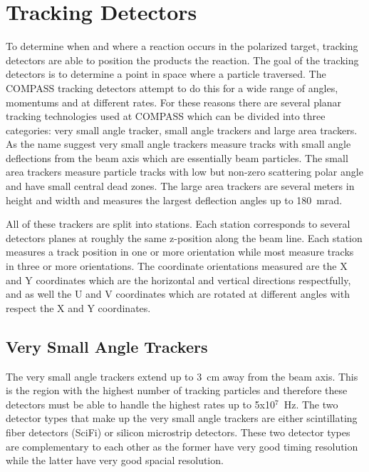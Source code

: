 \section{Tracking Detectors} \label{sec::tracking}
To determine when and where a reaction occurs in the polarized target, tracking
detectors are able to position the products the reaction.  The goal of the
tracking detectors is to determine a point in space where a particle traversed.
The COMPASS tracking detectors attempt to do this for a wide range of angles,
momentums and at different rates.  For these reasons there are several planar
tracking technologies used at COMPASS which can be divided into three
categories: very small angle tracker, small angle trackers and large area
trackers.  As the name suggest very small angle trackers measure tracks with
small angle deflections from the beam axis which are essentially beam particles.
The small area trackers measure particle tracks with low but non-zero scattering
polar angle and have small central dead zones.  The large area trackers are
several meters in height and width and measures the largest deflection angles up
to 180~mrad. \par

All of these trackers are split into stations.  Each station corresponds to
several detectors planes at roughly the same z-position along the beam line.
Each station measures a track position in one or more orientation while most
measure tracks in three or more orientations.  The coordinate orientations
measured are the X and Y coordinates which are the horizontal and vertical
directions respectfully, and as well the U and V coordinates which are rotated
at different angles with respect the X and Y coordinates. \par

\subsection{Very Small Angle Trackers}
The very small angle trackers extend up to 3~cm away from the beam axis.  This
is the region with the highest number of tracking particles and therefore these
detectors must be able to handle the highest rates up to 5x10$^7$~Hz.  The two
detector types that make up the very small angle trackers are either
scintillating fiber detectors (SciFi) or silicon microstrip detectors.  These
two detector types are complementary to each other as the former have very good
timing resolution while the latter have very good spacial resolution. \par


